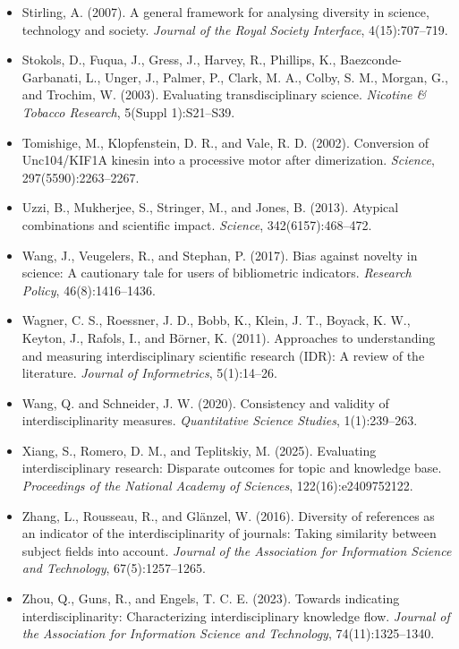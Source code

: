 \documentclass[
]{article}
\begin{document}
\begin{itemize}
  indicators of interdisciplinarity: case studies in bionanoscience.
  \emph{Scientometrics}, 82(2):263--287.
\item
  Stirling, A. (2007). A general framework for analysing diversity in
  science, technology and society. \emph{Journal of the Royal Society
  Interface}, 4(15):707--719.
\item
  Stokols, D., Fuqua, J., Gress, J., Harvey, R., Phillips, K.,
  Baezconde-Garbanati, L., Unger, J., Palmer, P., Clark, M. A., Colby,
  S. M., Morgan, G., and Trochim, W. (2003). Evaluating
  transdisciplinary science. \emph{Nicotine \& Tobacco Research},
  5(Suppl 1):S21--S39.
\item
  Tomishige, M., Klopfenstein, D. R., and Vale, R. D. (2002). Conversion
  of Unc104/KIF1A kinesin into a processive motor after dimerization.
  \emph{Science}, 297(5590):2263--2267.
\item
  Uzzi, B., Mukherjee, S., Stringer, M., and Jones, B. (2013). Atypical
  combinations and scientific impact. \emph{Science},
  342(6157):468--472.
\item
  Wang, J., Veugelers, R., and Stephan, P. (2017). Bias against novelty
  in science: A cautionary tale for users of bibliometric indicators.
  \emph{Research Policy}, 46(8):1416--1436.
\item
  Wagner, C. S., Roessner, J. D., Bobb, K., Klein, J. T., Boyack, K. W.,
  Keyton, J., Rafols, I., and Börner, K. (2011). Approaches to
  understanding and measuring interdisciplinary scientific research
  (IDR): A review of the literature. \emph{Journal of Informetrics},
  5(1):14--26.
\item
  Wang, Q. and Schneider, J. W. (2020). Consistency and validity of
  interdisciplinarity measures. \emph{Quantitative Science Studies},
  1(1):239--263.
\item
  Xiang, S., Romero, D. M., and Teplitskiy, M. (2025). Evaluating
  interdisciplinary research: Disparate outcomes for topic and knowledge
  base. \emph{Proceedings of the National Academy of Sciences},
  122(16):e2409752122.
\item
  Zhang, L., Rousseau, R., and Glänzel, W. (2016). Diversity of
  references as an indicator of the interdisciplinarity of journals:
  Taking similarity between subject fields into account. \emph{Journal
  of the Association for Information Science and Technology},
  67(5):1257--1265.
\item
  Zhou, Q., Guns, R., and Engels, T. C. E. (2023). Towards indicating
  interdisciplinarity: Characterizing interdisciplinary knowledge flow.
  \emph{Journal of the Association for Information Science and
  Technology}, 74(11):1325--1340.
\end{itemize}
\end{document}
